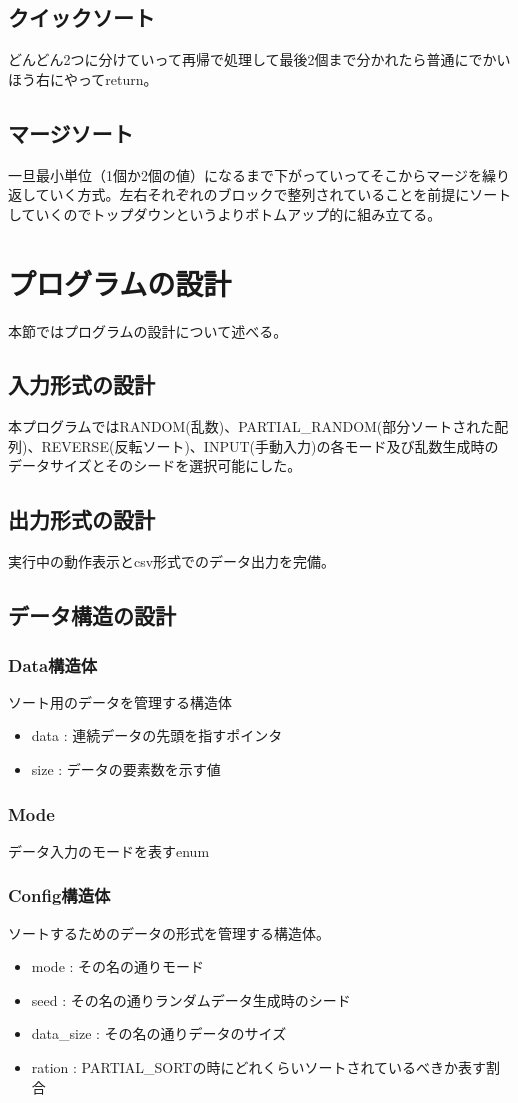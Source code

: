 \documentclass[dvipdfmx, a4paper, titlepage]{jsarticle}
\begin{document}
\subsection{クイックソート}
どんどん2つに分けていって再帰で処理して最後2個まで分かれたら普通にでかいほう右にやってreturn。
\subsection{マージソート}
一旦最小単位（1個か2個の値）になるまで下がっていってそこからマージを繰り返していく方式。左右それぞれのブロックで整列されていることを前提にソートしていくのでトップダウンというよりボトムアップ的に組み立てる。

\section{プログラムの設計}
本節ではプログラムの設計について述べる。
\subsection{入力形式の設計}
本プログラムではRANDOM(乱数)、PARTIAL\_RANDOM(部分ソートされた配列)、REVERSE(反転ソート)、INPUT(手動入力)の各モード及び乱数生成時のデータサイズとそのシードを選択可能にした。
\subsection{出力形式の設計}
実行中の動作表示とcsv形式でのデータ出力を完備。
\subsection{データ構造の設計}
\subsubsection{Data構造体}
ソート用のデータを管理する構造体
\begin{itemize}
  \item data : 連続データの先頭を指すポインタ
  \item size : データの要素数を示す値
\end{itemize}
\subsubsection{Mode}
データ入力のモードを表すenum
\subsubsection{Config構造体}
ソートするためのデータの形式を管理する構造体。
\begin{itemize}
  \item mode : その名の通りモード
  \item seed : その名の通りランダムデータ生成時のシード
  \item data\_size : その名の通りデータのサイズ
  \item ration : PARTIAL\_SORTの時にどれくらいソートされているべきか表す割合
\end{itemize}
\end{document}
